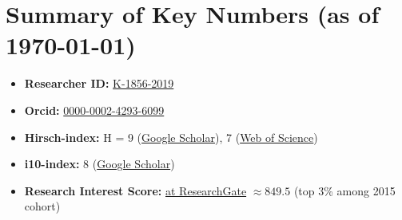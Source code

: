 \documentclass[10pt,a4paper,colorlinks,linkcolor=blue,urlcolor=blue,citecolor=blue]{moderncv}
\begin{document}
\section{Summary of Key Numbers (as of \today)}
\begin{itemize}[leftmargin=1.25em]
\item \textbf{Researcher ID:} \href{https://www.webofscience.com/wos/author/record/K-1856-2019}{K-1856-2019}
\item \textbf{Orcid:} \href{https://orcid.org/0000-0002-4293-6099}{0000-0002-4293-6099}
\item \textbf{Hirsch-index:} H = 9 (\href{https://scholar.google.com/citations?hl=en&user=67aQviYAAAAJ}{Google Scholar}), 7 (\href{https://www.webofscience.com/wos/author/record/K-1856-2019}{Web of Science})
\item \textbf{i10-index:} 8 (\href{https://scholar.google.com/citations?hl=en&user=67aQviYAAAAJ}{Google Scholar})
\item \textbf{Research Interest Score:} \href{https://www.researchgate.net/profile/Vatsal-Sanjay-2}{at ResearchGate} $\approx 849.5$ (top 3\% among 2015 cohort)
\end{itemize}

\end{document}
